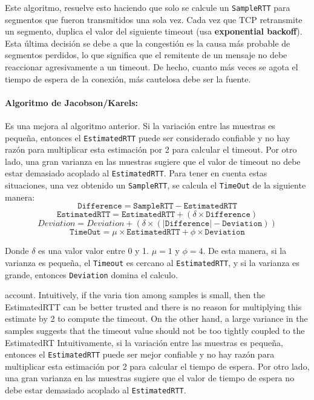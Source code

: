 Este algoritmo, resuelve esto haciendo que solo se calcule un \texttt{SampleRTT} para segmentos que fueron transmitidos una sola vez. Cada vez que TCP retransmite un segmento, duplica el valor del siguiente timeout (usa \textbf{exponential backoff}). Esta última decisión se debe a que la congestión es la causa más probable de segmentos perdidos, lo que significa que el remitente de un mensaje no debe reaccionar agresivamente a un timeout. De hecho, cuanto más veces se agota el tiempo de espera de la conexión, más cautelosa debe ser la fuente.

\paragraph{Algoritmo de Jacobson/Karels:} Es una mejora al algoritmo anterior. Si la variación entre las muestras es pequeña, entonces el \texttt{EstimatedRTT} puede ser considerado confiable y no hay razón para multiplicar esta estimación por 2 para calcular el timeout. Por otro lado, una gran varianza en las muestras sugiere que el valor de timeout no debe estar demasiado acoplado al \texttt{EstimatedRTT}. Para tener en cuenta estas situaciones, una vez obtenido un \texttt{SampleRTT}, se calcula el \texttt{TimeOut} de la siguiente manera:
\[\texttt{Difference} = \texttt{SampleRTT} - \texttt{EstimatedRTT}\]
\[ \texttt{EstimatedRTT} = \texttt{EstimatedRTT} + (\delta\times\texttt{Difference})\]
\[Deviation = Deviation + (\delta\times(|\texttt{Difference}| - \texttt{Deviation}))\]
\[\texttt{TimeOut} = \mu\times\texttt{EstimatedRTT} + \phi\times\texttt{Deviation}\]

Donde \(\delta\) es una valor valor entre 0 y 1. \(\mu = 1\) y \(\phi=4\).  De esta manera, si la varianza es pequeña, el \texttt{Timeout} es cercano al \texttt{EstimatedRTT}, y si la varianza es grande, entonces \texttt{Deviation} domina el calculo.

\newpage

account. Intuitively, if the varia
tion
among samples is small, then the EstimatedRTT can be better trusted
and there is no reason for multiplying this estimate by 2 to compute the
timeout. On the other hand, a large variance in the samples suggests that
the timeout value should not be too tightly coupled to the EstimatedRT
Intuitivamente, si la variación entre las muestras es pequeña, entonces el \texttt{EstimatedRTT} puede ser mejor confiable y no hay razón para multiplicar esta estimación por 2 para calcular el tiempo de espera. Por otro lado, una gran varianza en las muestras sugiere que el valor de tiempo de espera no debe estar demasiado acoplado al \texttt{EstimatedRTT}.

